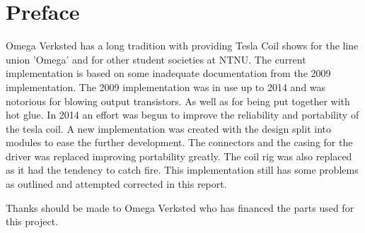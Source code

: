 \section*{Preface}

Omega Verksted has a long tradition with providing Tesla Coil shows for the line union 'Omega' and for other student societies at NTNU. The current implementation is based on some inadequate documentation from the 2009 implementation. The 2009 implementation was in use up to 2014 and was notorious for blowing output transistors. As well as for being put together with hot glue. In 2014 an effort was begun to improve the reliability and portability of the tesla coil. A new implementation was created with the design split into modules to ease the further development. The connectors and the casing for the driver was replaced improving portability greatly. The coil rig was also replaced as it had the tendency to catch fire. This implementation still has some problems as outlined and attempted corrected in this report.

Thanks should be made to Omega Verksted who has financed the parts used for this project.